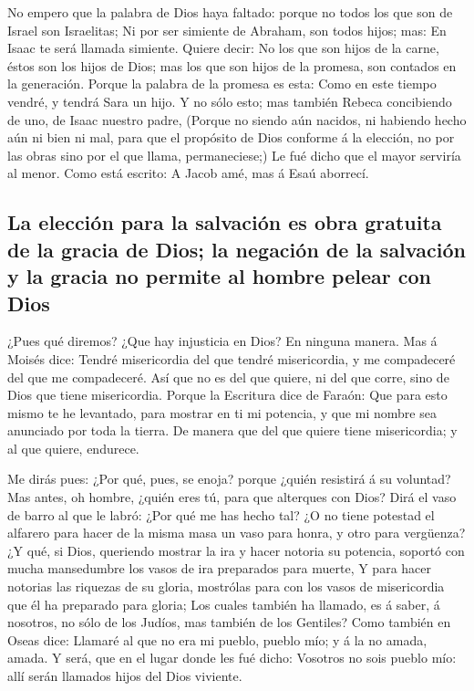  No empero que la palabra de Dios haya faltado: porque no
todos los que son de Israel son Israelitas;  Ni por ser
simiente de Abraham, son todos hijos; mas: En Isaac te será llamada
simiente.  Quiere decir: No los que son hijos de la carne,
éstos son los hijos de Dios; mas los que son hijos de la promesa, son
contados en la generación.  Porque la palabra de la
promesa es esta: Como en este tiempo vendré, y tendrá Sara un hijo.
 Y no sólo esto; mas también Rebeca concibiendo de uno,
de Isaac nuestro padre,  (Porque no siendo aún nacidos,
ni habiendo hecho aún ni bien ni mal, para que el propósito de Dios
conforme á la elección, no por las obras sino por el que llama,
permaneciese;)  Le fué dicho que el mayor serviría al
menor.  Como está escrito: A Jacob amé, mas á Esaú
aborrecí.

\hypertarget{la-elecciuxf3n-para-la-salvaciuxf3n-es-obra-gratuita-de-la-gracia-de-dios-la-negaciuxf3n-de-la-salvaciuxf3n-y-la-gracia-no-permite-al-hombre-pelear-con-dios}{%
\subsection{La elección para la salvación es obra gratuita de la gracia
de Dios; la negación de la salvación y la gracia no permite al hombre
pelear con
Dios}\label{la-elecciuxf3n-para-la-salvaciuxf3n-es-obra-gratuita-de-la-gracia-de-dios-la-negaciuxf3n-de-la-salvaciuxf3n-y-la-gracia-no-permite-al-hombre-pelear-con-dios}}

 ¿Pues qué diremos? ¿Que hay injusticia en Dios? En
ninguna manera.  Mas á Moisés dice: Tendré misericordia
del que tendré misericordia, y me compadeceré del que me compadeceré.
 Así que no es del que quiere, ni del que corre, sino de
Dios que tiene misericordia.  Porque la Escritura dice de
Faraón: Que para esto mismo te he levantado, para mostrar en ti mi
potencia, y que mi nombre sea anunciado por toda la tierra.
 De manera que del que quiere tiene misericordia; y al
que quiere, endurece.

 Me dirás pues: ¿Por qué, pues, se enoja? porque ¿quién
resistirá á su voluntad?  Mas antes, oh hombre, ¿quién
eres tú, para que alterques con Dios? Dirá el vaso de barro al que le
labró: ¿Por qué me has hecho tal?  ¿O no tiene potestad
el alfarero para hacer de la misma masa un vaso para honra, y otro para
vergüenza?  ¿Y qué, si Dios, queriendo mostrar la ira y
hacer notoria su potencia, soportó con mucha mansedumbre los vasos de
ira preparados para muerte,  Y para hacer notorias las
riquezas de su gloria, mostrólas para con los vasos de misericordia que
él ha preparado para gloria;  Los cuales también ha
llamado, es á saber, á nosotros, no sólo de los Judíos, mas también de
los Gentiles?  Como también en Oseas dice: Llamaré al que
no era mi pueblo, pueblo mío; y á la no amada, amada.  Y
será, que en el lugar donde les fué dicho: Vosotros no sois pueblo mío:
allí serán llamados hijos del Dios viviente.

